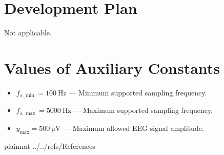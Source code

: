 \documentclass[12pt]{article}
\begin{document}
\section{Development Plan}
Not applicable.








\section{Values of Auxiliary Constants}

\begin{itemize}
    \item $f_{s,\min} = 100~\si{\hertz}$ — Minimum supported sampling frequency.
    \item $f_{s,\max} = 5000~\si{\hertz}$ — Maximum supported sampling frequency.
    \item $y_{\max} = 500~\si{\micro\volt}$ — Maximum allowed EEG signal amplitude.
\end{itemize}








 {plainnat}
 {../../refs/References}
\end{document}
